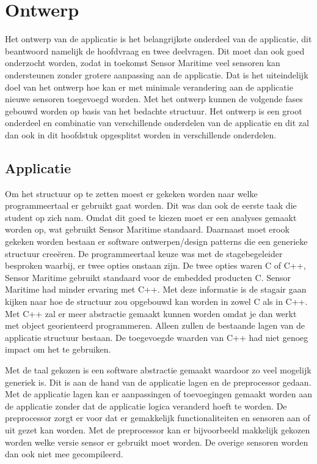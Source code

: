 \newpage
\section{Ontwerp}
Het ontwerp van de applicatie is het belangrijkste onderdeel van de applicatie, dit beantwoord namelijk de hoofdvraag en twee deelvragen. Dit moet dan ook goed onderzocht worden, zodat in toekomst Sensor Maritime veel sensoren kan ondersteunen zonder grotere aanpassing aan de applicatie. Dat is het uiteindelijk doel van het ontwerp hoe kan er met minimale verandering aan de applicatie nieuwe sensoren toegevoegd worden. Met het ontwerp kunnen de volgende fases gebouwd worden op basis van het bedachte structuur. Het ontwerp is een groot onderdeel en combinatie van verschillende onderdelen van de applicatie en dit zal dan ook in dit hoofdstuk opgesplitst worden in verschillende onderdelen.

\subsection{Applicatie}
Om het structuur op te zetten moest er gekeken worden naar welke programmeertaal er gebruikt gaat worden. Dit was dan ook de eerste taak die student op zich nam. Omdat dit goed te kiezen moet er een analyses gemaakt worden op, wat gebruikt Sensor Maritime standaard. Daarnaast moet erook gekeken worden bestaan er software ontwerpen/design patterns die een generieke structuur creeëren. De programmeertaal keuze was met de stagebegeleider besproken waarbij, er twee opties onstaan zijn. De twee opties waren C of C++, Sensor Maritime gebruikt standaard voor de embedded producten C. Sensor Maritime had minder ervaring met C++. Met deze informatie is de stagair gaan kijken naar hoe de structuur zou opgebouwd kan worden in zowel C als in C++. Met C++ zal er meer abstractie gemaakt kunnen worden omdat je dan werkt met object georienteerd programmeren. Alleen zullen de bestaande lagen van de applicatie structuur bestaan. De toegevoegde waarden van C++ had niet genoeg impact om het te gebruiken. \newline

\noindent Met de taal gekozen is een software abstractie gemaakt waardoor zo veel mogelijk generiek is. Dit is aan de hand van de applicatie lagen en de preprocessor gedaan. Met de applicatie lagen kan er aanpassingen of toevoegingen gemaakt worden aan de applicatie zonder dat de applicatie logica veranderd hoeft te worden. De preprocessor zorgt er voor dat er gemakkelijk functionaliteiten en sensoren aan of uit gezet kan worden. Met de preprocessor kan er bijvoorbeeld makkelijk gekozen worden welke versie sensor er gebruikt moet worden. De overige sensoren worden dan ook niet mee gecompileerd.

